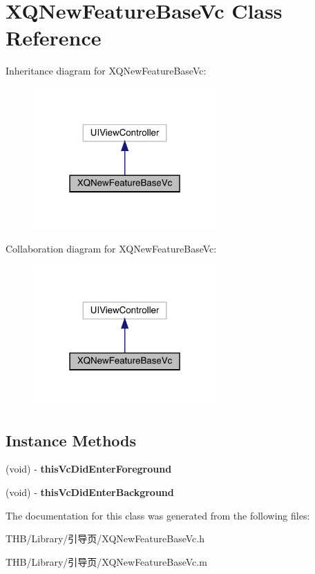 \hypertarget{interface_x_q_new_feature_base_vc}{}\section{X\+Q\+New\+Feature\+Base\+Vc Class Reference}
\label{interface_x_q_new_feature_base_vc}


Inheritance diagram for X\+Q\+New\+Feature\+Base\+Vc\+:\nopagebreak
\begin{figure}[H]
\begin{center}
\leavevmode
\includegraphics[width=199pt]{interface_x_q_new_feature_base_vc__inherit__graph}
\end{center}
\end{figure}


Collaboration diagram for X\+Q\+New\+Feature\+Base\+Vc\+:\nopagebreak
\begin{figure}[H]
\begin{center}
\leavevmode
\includegraphics[width=199pt]{interface_x_q_new_feature_base_vc__coll__graph}
\end{center}
\end{figure}
\subsection*{Instance Methods}
\begin{DoxyCompactItemize}
\item 
\mbox{\label{interface_x_q_new_feature_base_vc_a9ced7a144a8806bc4fc26d8aba84f51a}} 
(void) -\/ {\bfseries this\+Vc\+Did\+Enter\+Foreground}
\item 
\mbox{\label{interface_x_q_new_feature_base_vc_a83049350d61a946c1889580c3b4d724b}} 
(void) -\/ {\bfseries this\+Vc\+Did\+Enter\+Background}
\end{DoxyCompactItemize}


The documentation for this class was generated from the following files\+:\begin{DoxyCompactItemize}
\item 
T\+H\+B/\+Library/引导页/X\+Q\+New\+Feature\+Base\+Vc.\+h\item 
T\+H\+B/\+Library/引导页/X\+Q\+New\+Feature\+Base\+Vc.\+m\end{DoxyCompactItemize}
